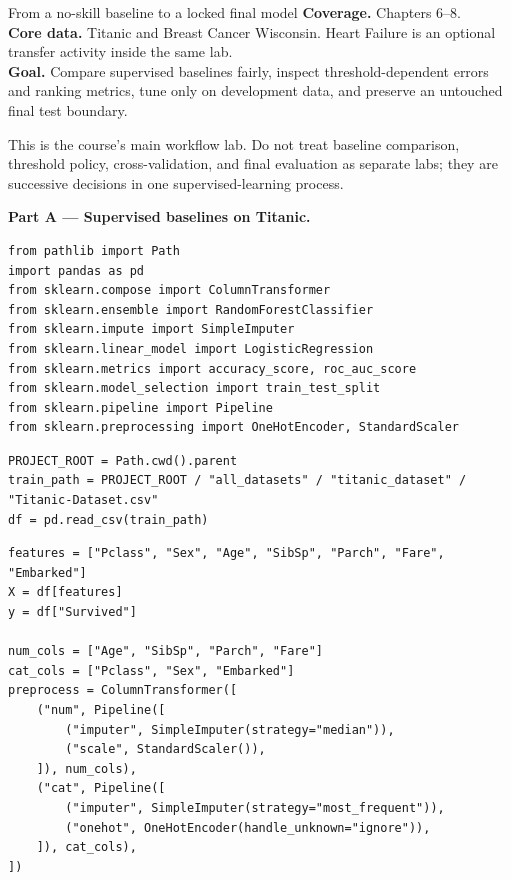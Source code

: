 
\begin{labproject}{From a no-skill baseline to a locked final model}
\textbf{Coverage.} Chapters 6--8.\\
\textbf{Core data.} Titanic and Breast Cancer Wisconsin. Heart Failure is an optional transfer activity inside the same lab.\\
\textbf{Goal.} Compare supervised baselines fairly, inspect threshold-dependent errors and ranking metrics, tune only on development data, and preserve an untouched final test boundary.

\begin{labmode}
This is the course's main workflow lab. Do not treat baseline comparison, threshold policy, cross-validation, and final evaluation as separate labs; they are successive decisions in one supervised-learning process.
\end{labmode}

\medskip\noindent\textbf{Part A --- Supervised baselines on Titanic.}\par
\begin{lstlisting}[style=mlpython]
from pathlib import Path
import pandas as pd
from sklearn.compose import ColumnTransformer
from sklearn.ensemble import RandomForestClassifier
from sklearn.impute import SimpleImputer
from sklearn.linear_model import LogisticRegression
from sklearn.metrics import accuracy_score, roc_auc_score
from sklearn.model_selection import train_test_split
from sklearn.pipeline import Pipeline
from sklearn.preprocessing import OneHotEncoder, StandardScaler
\end{lstlisting}

\begin{lstlisting}[style=mlpython]
PROJECT_ROOT = Path.cwd().parent
train_path = PROJECT_ROOT / "all_datasets" / "titanic_dataset" / "Titanic-Dataset.csv"
df = pd.read_csv(train_path)
\end{lstlisting}

\begin{lstlisting}[style=mlpython]
features = ["Pclass", "Sex", "Age", "SibSp", "Parch", "Fare", "Embarked"]
X = df[features]
y = df["Survived"]

num_cols = ["Age", "SibSp", "Parch", "Fare"]
cat_cols = ["Pclass", "Sex", "Embarked"]
preprocess = ColumnTransformer([
    ("num", Pipeline([
        ("imputer", SimpleImputer(strategy="median")),
        ("scale", StandardScaler()),
    ]), num_cols),
    ("cat", Pipeline([
        ("imputer", SimpleImputer(strategy="most_frequent")),
        ("onehot", OneHotEncoder(handle_unknown="ignore")),
    ]), cat_cols),
])
\end{lstlisting}


\end{labproject}
